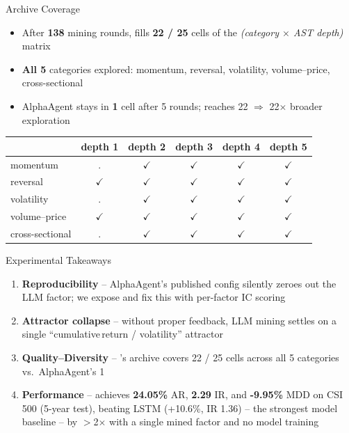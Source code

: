 \begin{frame}{\prjname{} Archive Coverage}
\begin{itemize}
    \item After \textbf{138} mining rounds, \prjname{} fills
          \textbf{22 / 25} cells of the
          \emph{(category $\times$ AST depth)} matrix
    \item \textbf{All 5} categories explored: momentum, reversal,
          volatility, volume--price, cross-sectional
    \item AlphaAgent stays in \textbf{1} cell after 5 rounds; \prjname{}
          reaches 22 $\Rightarrow$ \alert{22$\times$ broader exploration}
\end{itemize}

\medskip
\centering
\scriptsize
\setlength{\tabcolsep}{6pt}
\begin{tabular}{l|ccccc}
\toprule
                  & depth 1 & depth 2 & depth 3 & depth 4 & depth 5 \\
\midrule
momentum          & .            & $\checkmark$ & $\checkmark$ & $\checkmark$ & $\checkmark$ \\
reversal          & $\checkmark$ & $\checkmark$ & $\checkmark$ & $\checkmark$ & $\checkmark$ \\
volatility        & .            & $\checkmark$ & $\checkmark$ & $\checkmark$ & $\checkmark$ \\
volume--price     & $\checkmark$ & $\checkmark$ & $\checkmark$ & $\checkmark$ & $\checkmark$ \\
cross-sectional   & .            & $\checkmark$ & $\checkmark$ & $\checkmark$ & $\checkmark$ \\
\bottomrule
\end{tabular}
\end{frame}

\begin{frame}{Experimental Takeaways}
\begin{enumerate}
    \item \textbf{Reproducibility} -- AlphaAgent's published config silently
          zeroes out the LLM factor; we expose and fix this with
          per-factor IC scoring
    \item \textbf{Attractor collapse} -- without proper feedback, LLM mining
          settles on a single ``cumulative\,return / volatility'' attractor
    \item \textbf{Quality--Diversity} -- \prjname{}'s archive covers
          \alert{22 / 25 cells} across all 5 categories vs.\ AlphaAgent's
          \alert{1}
    \item \textbf{Performance} -- \prjname{} achieves
          \alert{\textbf{24.05\%}} AR, \alert{\textbf{2.29}} IR, and
          \alert{\textbf{-9.95\%}} MDD on CSI 500 (5-year test),
          \alert{beating LSTM (+10.6\%, IR 1.36) -- the strongest
          model baseline -- by $>$2$\times$} with a single mined
          factor and no model training
\end{enumerate}
\end{frame}

